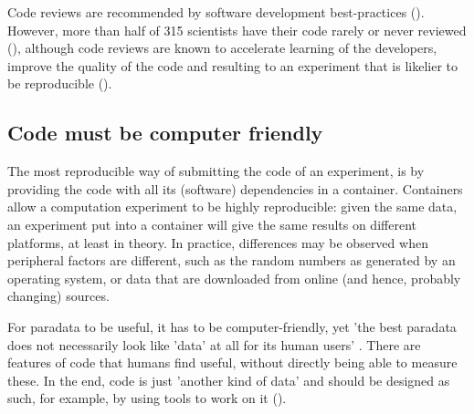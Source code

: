 Code reviews are recommended by software development 
best-practices (\cite{wilson2014best}).
However, more than half of 315 scientists 
have their code rarely or never reviewed (\cite{vable2021code}),
although code reviews are known to
accelerate learning of the developers,
improve the quality of the code
and resulting to an experiment that is likelier to be reproducible
(\cite{vable2021code}).

\subsection{Code must be computer friendly}


The most reproducible way of submitting the code of an experiment,
is by providing the code with all its (software) dependencies 
in a container.
Containers allow a computation experiment to be highly reproducible:
given the same data, an experiment put into a container will give
the same results on different platforms, at least in theory.
In practice, differences may be observed when peripheral factors
are different, such as the random numbers as generated by an operating
system, or data that are downloaded from online (and hence, probably changing) sources.


For paradata to be useful, it has to be computer-friendly, yet 
'the best paradata does not necessarily look like 'data' at all for its
human users' \cite{huvila2022improving}.
There are features of code that humans find useful,
without directly being able to measure these.
In the end, code is just 'another kind of data' and should be designed 
as such, for example, by using tools to work on it (\cite{wilson2022twelve}).


